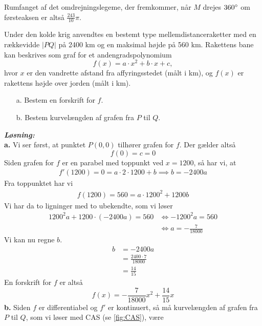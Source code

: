 \documentclass{article}
\newcommand{\sol}{\setlength{\parindent}{0cm}\textbf{\textit{Løsning:}}\setlength{\parindent}{1cm}}
\begin{document}
Rumfanget af det omdrejningslegeme, der fremkommer, når $M$ drejes $360 \degree $ om førsteaksen er altså $\frac{243}{10}\pi$. 
\begin{question}{}{}
  Under den kolde krig anvendtes en bestemt type mellemdistanceraketter med en rækkevidde $|PQ|$ på 2400 km og en maksimal højde på 560 km.
Rakettens bane kan beskrives som graf for et andengradspolynomium
$$f(x)=a\cdot x^2+b\cdot x+c,$$
hvor $x$ er den vandrette afstand fra affyringsstedet (målt i km), og $f(x)$ er rakettens højde
over jorden (målt i km).
\begin{itemize}
  \item[a.] Bestem en forskrift for $f$.
  \item[b.] Bestem kurvelængden af grafen fra $P$ til $Q$.
\end{itemize}
\end{question}
\sol \\
\textbf{a.}
Vi ser først, at punktet $P(0,0)$ tilhører grafen for $f$. 
Der gælder altså
\[
f(0)= c=0
\] 
Siden grafen for $f$ er en parabel med toppunkt ved $x=1200$, så har vi, at 
\begin{equation*}
\begin{split}
  f'(1200)= 0=a \cdot 2 \cdot 1200 +b\implies b=-2400a
\end{split}
\end{equation*}
Fra toppunktet har vi 
\begin{equation*}
\begin{split}
  f(1200)= 560=a \cdot 1200^2+1200b
\end{split}
\end{equation*}
Vi har da to ligninger med to ubekendte, som vi løser
\begin{equation*}
\begin{split}
  1200^2a+1200 \cdot \left(-2400 a\right) =560 &\iff -1200^2a=560\\ 
  &\iff a=-\frac{7}{18000}
\end{split}
\end{equation*}
Vi kan nu regne $b$.
\begin{equation*}
\begin{split}
  b&=-2400 a\\ 
  &=\frac{2400 \cdot 7}{18000}\\ 
  &=\frac{14}{15}
\end{split}
\end{equation*}
En forskrift for $f$ er altså 
\[
f(x)= -\frac{7}{18000}x^2+\frac{14}{15}x
\] 
\textbf{b.}
Siden $f$ er differentiabel og $f'$ er kontinuert, så må kurvelængden af grafen fra $P$ til $Q$, som vi løser med CAS (se \cref{fig:CAS}), være
\end{document}
